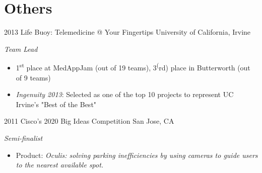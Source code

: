 \documentclass[]{friggeri-cv} %
\begin{document}

\pagebreak
\section{Others}

\begin{entrylist}
\entry
{2013}
{Life Buoy: Telemedicine @ Your Fingertips}
{University of California, Irvine}
{\emph{Team Lead} 
\begin{itemize}
\item 1\textsuperscript{st}  place at MedAppJam (out of 19 teams), 3\textsuperscript(rd) place in Butterworth (out of 9 teams)
\item \emph{Ingenuity 2013}: Selected as one of the top 10 projects to represent UC Irvine's "Best of the Best"
\end{itemize}}
\entry
{2011}
{Cisco's 2020 Big Ideas Competition}
{San Jose, CA}
{\emph{Semi-finalist} 
\begin{itemize}
\item Product: \emph{Oculis: solving parking inefficiencies by using cameras to guide users to the nearest available spot.}\end{itemize}}
\end{entrylist}

%
%
\end{document}
